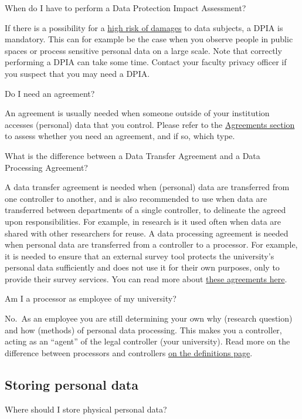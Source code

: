 \documentclass[
]{book}
\begin{document}
When do I have to perform a Data Protection Impact Assessment?

If there is a possibility for a \protect\hyperlink{high-risk-processing}{high risk of damages} to data subjects, a DPIA is mandatory. This can for example be the case when you observe people in public spaces or process sensitive personal data on a large scale. Note that correctly performing a DPIA can take some time. Contact your faculty privacy officer if you suspect that you may need a DPIA.

Do I need an agreement?

An agreement is usually needed when someone outside of your institution accesses (personal) data that you control. Please refer to the \protect\hyperlink{agreements}{Agreements section} to assess whether you need an agreement, and if so, which type.

What is the difference between a Data Transfer Agreement and a Data Processing Agreement?

A data transfer agreement is needed when (personal) data are transferred from one controller to another, and is also recommended to use when data are transferred between departments of a single controller, to delineate the agreed upon responsibilities. For example, in research is it used often when data are shared with other researchers for reuse. A data processing agreement is needed when personal data are transferred from a controller to a processor. For example, it is needed to ensure that an external survey tool protects the university's personal data sufficiently and does not use it for their own purposes, only to provide their survey services. You can read more about \protect\hyperlink{agreements}{these agreements here}.

Am I a processor as employee of my university?

No.~As an employee you are still determining your own why (research question) and how (methods) of personal data processing. This makes you a controller, acting as an ``agent'' of the legal controller (your university). Read more on the difference between processors and controllers \protect\hyperlink{definitions}{on the definitions page}.

\hypertarget{storage}{%
\subsection{Storing personal data}\label{storage}}

Where should I store physical personal data?
\end{document}
